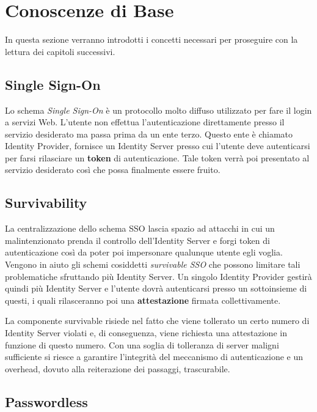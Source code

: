 \chapter{Conoscenze di Base}
\label{conoscenze}

In questa sezione verranno introdotti i concetti necessari per proseguire con la lettura dei capitoli successivi. 

\section{Single Sign-On}
\label{sso}


Lo schema \emph{Single Sign-On} è un protocollo molto diffuso utilizzato per fare il login a servizi Web. L'utente non effettua l'autenticazione direttamente presso il servizio desiderato ma passa prima da un ente terzo. Questo ente è chiamato Identity Provider, fornisce un Identity Server presso cui l'utente deve autenticarsi per farsi rilasciare un \textbf{token} di autenticazione. Tale token verrà poi presentato al servizio desiderato così che possa finalmente essere fruito. 

\section{Survivability}
\label{surviv}

La centralizzazione dello schema SSO lascia spazio ad attacchi in cui un malintenzionato prenda il controllo dell'Identity Server e forgi token di autenticazione così da poter poi impersonare qualunque utente egli voglia. Vengono in aiuto gli schemi cosiddetti \emph{survivable SSO} che possono limitare tali problematiche sfruttando più Identity Server. Un singolo Identity Provider gestirà quindi più Identity Server e l'utente dovrà autenticarsi presso un sottoinsieme di questi, i quali rilasceranno poi una \textbf{attestazione} firmata collettivamente. 

La componente survivable risiede nel fatto che viene tollerato un certo numero di Identity Server violati e, di conseguenza, viene richiesta una attestazione in funzione di questo numero. Con una soglia di tolleranza di server maligni sufficiente si riesce a garantire l'integrità del meccanismo di autenticazione e un overhead, dovuto alla reiterazione dei passaggi, trascurabile.

\section{Passwordless}
\label{passwordless}

